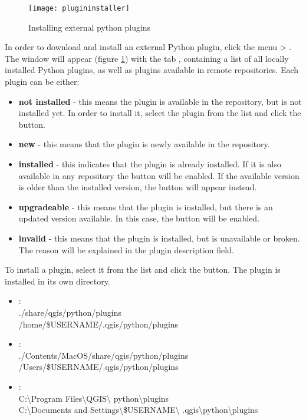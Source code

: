 \begin{figure}[ht]
   \begin{center}
   \caption{Installing external python plugins \nixcaption}
\label{fig:plugininstaller}\smallskip
   \texttt{[image: plugininstaller]}
\end{center}
\end{figure}

In order to download and install an external Python plugin, click the menu  > .
The  window will appear (figure \ref{fig:plugininstaller}) with the tab , containing a list of all locally installed Python plugins, as well as plugins available in remote repositories. Each plugin can be either:
\begin{itemize}
\item \textbf{not installed} - this means the plugin is available in the repository, but is not installed yet. In order to install it, select the plugin from the list and click the  button.
\item \textbf{new} - this means that the plugin is newly available in the repository.
\item \textbf{installed} - this indicates that the plugin is already installed. If it is also available in any repository the  button will be enabled. If the available version is older than the installed version, the  button will appear instead.
\item \textbf{upgradeable} - this means that the plugin is installed, but there is an updated version available. In this case, the  button will be enabled.
\item \textbf{invalid} - this means that the plugin is installed, but is unavailable or broken. The reason will be explained in the plugin description field.
\end{itemize}


To install a plugin, select it from the list and click the  button. The plugin is installed in its own directory. 

\begin{itemize}
\item {}:\\
./share/qgis/python/plugins \\
/home/\$USERNAME/.qgis/python/plugins
\item {}:\\
./Contents/MacOS/share/qgis/python/plugins \\
/Users/\$USERNAME/.qgis/python/plugins
\item {}:\\
C:\textbackslash Program Files\textbackslash QGIS\textbackslash
python\textbackslash plugins \\
C:\textbackslash Documents and Settings\textbackslash\$USERNAME\textbackslash
.qgis\textbackslash python\textbackslash plugins
\end{itemize}

